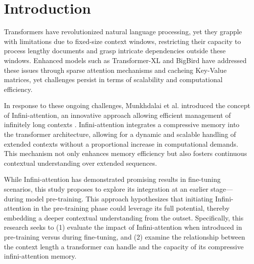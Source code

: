\section{Introduction}



Transformers have revolutionized natural language processing, yet they grapple with limitations due to fixed-size context windows,
 restricting their capacity to process lengthy documents and grasp intricate dependencies outside these windows.
  Enhanced models such as Transformer-XL and BigBird have addressed these issues through sparse attention mechanisms and cacheing Key-Value matrices,
   yet challenges persist in terms of scalability and computational efficiency. 

In response to these ongoing challenges, Munkhdalai et al. introduced the concept of Infini-attention, an innovative approach allowing efficient management
 of infinitely long contexts \cite{munkhdalai_leave_2024}.
  Infini-attention integrates a compressive memory into the transformer architecture, allowing for a dynamic and scalable handling
   of extended contexts without a proportional increase in computational demands. This mechanism not only enhances memory efficiency
    but also fosters continuous contextual understanding over extended sequences.

While Infini-attention has demonstrated promising results in fine-tuning scenarios, this study proposes to explore its integration at an
 earlier stage—during model pre-training. This approach hypothesizes that initiating Infini-attention in the pre-training phase could
  leverage its full potential, thereby embedding a deeper contextual understanding from the outset. Specifically,
   this research seeks to (1) evaluate the impact of Infini-attention when introduced in pre-training versus during fine-tuning, 
   and (2) examine the relationship between the context length a transformer can handle and the capacity of its compressive infini-attention memory.


